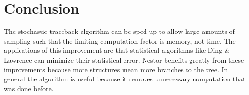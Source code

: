 \section{Conclusion}

The stochastic traceback algorithm can be sped up to allow large
amounts of sampling such that the limiting computation factor is
memory, not time. The applications of this improvement are that
statistical algorithms like Ding \& Lawrence \cite{ding2004sfold}
\cite{ding2005rna} can minimize their statistical error. Nestor
\cite{aalbertsNestor} benefits greatly from these improvements because
more structures mean more branches to the tree. In general the
algorithm is useful because it removes unnecessary computation that
was done before.
